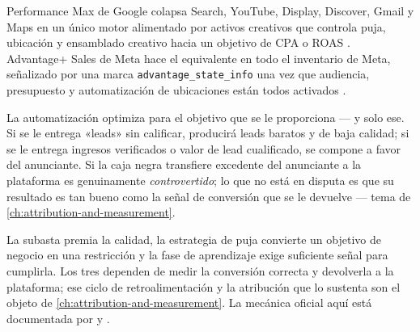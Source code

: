 Performance Max de Google colapsa Search, YouTube, Display, Discover, Gmail y Maps en un único motor alimentado por activos creativos que controla puja, ubicación y ensamblado creativo hacia un objetivo de CPA o ROAS \parencite{gads10724817,gads10724896}. Advantage+ Sales de Meta hace el equivalente en todo el inventario de Meta, señalizado por una marca \texttt{advantage\_state\_info} una vez que audiencia, presupuesto y automatización de ubicaciones están todos activados \parencite{metadev-advantage-plus-campaign-}.

La automatización optimiza para el objetivo que se le proporciona --- y solo ese. Si se le entrega «leads» sin calificar, producirá leads baratos y de baja calidad; si se le entrega ingresos verificados o valor de lead cualificado, se compone a favor del anunciante. Si la caja negra transfiere excedente del anunciante a la plataforma es genuinamente \emph{controvertido}; lo que no está en disputa es que su resultado es tan bueno como la señal de conversión que se le devuelve --- tema de \cref{ch:attribution-and-measurement}.

La subasta premia la calidad, la estrategia de puja convierte un objetivo de negocio en una restricción y la fase de aprendizaje exige suficiente señal para cumplirla. Los tres dependen de medir la conversión correcta y devolverla a la plataforma; ese ciclo de retroalimentación y la atribución que lo sustenta son el objeto de \cref{ch:attribution-and-measurement}. La mecánica oficial aquí está documentada por \textcite{gads1722122} y \textcite{metadev-advantage-campaigns}.
